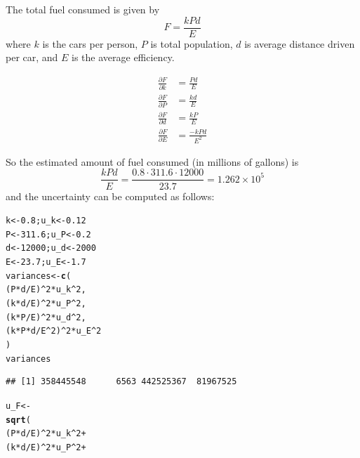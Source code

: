 \documentclass[twoside]{book}\usepackage[]{graphicx}\usepackage[]{xcolor}
\makeatletter
\newcommand{\hlnum}[1]{\textcolor[rgb]{0.686,0.059,0.569}{#1}}%
\newcommand{\hlopt}[1]{\textcolor[rgb]{0,0,0}{#1}}%
\newcommand{\hlstd}[1]{\textcolor[rgb]{0.345,0.345,0.345}{#1}}%
\newcommand{\hlkwb}[1]{\textcolor[rgb]{0.69,0.353,0.396}{#1}}%
\newcommand{\hlkwd}[1]{\textcolor[rgb]{0.737,0.353,0.396}{\textbf{#1}}}%
\newenvironment{kframe}{%
 \def\at@end@of@kframe{}%
 \ifinner\ifhmode%
  \def\at@end@of@kframe{\end{minipage}}%
  \begin{minipage}{\columnwidth}%
 \fi\fi%
 \def\FrameCommand##1{\hskip\@totalleftmargin \hskip-\fboxsep
 \colorbox{shadecolor}{##1}\hskip-\fboxsep
     \hskip-\linewidth \hskip-\@totalleftmargin \hskip\columnwidth}%
 \MakeFramed {\advance\hsize-\width
   \@totalleftmargin\z@ \linewidth\hsize
   \@setminipage}}%
 {\par\unskip\endMakeFramed%
 \at@end@of@kframe}
\newenvironment{knitrout}{}{} %
\newcommand{\Partial}[2]{\frac{\partial #1}{\partial #2}}
\makeatother
\begin{document}
\begin{solution}
The total fuel consumed is given by
\[
F = \frac{kPd}{E}
\]
where $k$ is the cars per person, $P$ is total population, $d$ is average distance 
driven per car, and $E$ is the average efficiency.

\begin{align*}
\Partial{F}{k} &= \frac{Pd}{E} 
\\
\Partial{F}{P} &= \frac{kd}{E}
\\
\Partial{F}{d} &= \frac{kP}{E}
\\
\Partial{F}{E} &= \frac{-kPd}{E^2}
\end{align*}

So the estimated amount of fuel consumed (in millions of gallons) is 
\[
\frac{kPd}{E} = \frac{0.8 \cdot 311.6 \cdot 12000 }{23.7}
= \ensuremath{1.262\times 10^{5}}
\]
and the uncertainty can be computed as follows:
\begin{knitrout}
\color{fgcolor}\begin{kframe}
\begin{alltt}
\hlstd{k} \hlkwb{<-} \hlnum{0.8}\hlstd{; u_k} \hlkwb{<-} \hlnum{0.12}
\hlstd{P} \hlkwb{<-} \hlnum{311.6}\hlstd{; u_P} \hlkwb{<-} \hlnum{0.2}
\hlstd{d} \hlkwb{<-} \hlnum{12000}\hlstd{; u_d} \hlkwb{<-} \hlnum{2000}
\hlstd{E} \hlkwb{<-} \hlnum{23.7}\hlstd{; u_E} \hlkwb{<-} \hlnum{1.7}
\hlstd{variances} \hlkwb{<-} \hlkwd{c}\hlstd{(}
            \hlstd{(P}\hlopt{*}\hlstd{d}\hlopt{/}\hlstd{E)}\hlopt{^}\hlnum{2} \hlopt{*} \hlstd{u_k}\hlopt{^}\hlnum{2} \hlstd{,}
            \hlstd{(k}\hlopt{*}\hlstd{d}\hlopt{/}\hlstd{E)}\hlopt{^}\hlnum{2} \hlopt{*} \hlstd{u_P}\hlopt{^}\hlnum{2} \hlstd{,}
            \hlstd{(k}\hlopt{*}\hlstd{P}\hlopt{/}\hlstd{E)}\hlopt{^}\hlnum{2} \hlopt{*} \hlstd{u_d}\hlopt{^}\hlnum{2} \hlstd{,}
            \hlstd{(k} \hlopt{*} \hlstd{P} \hlopt{*} \hlstd{d}\hlopt{/}\hlstd{E}\hlopt{^}\hlnum{2}\hlstd{)}\hlopt{^}\hlnum{2} \hlopt{*} \hlstd{u_E}\hlopt{^}\hlnum{2}
\hlstd{)}
\hlstd{variances}
\end{alltt}
\begin{verbatim}
## [1] 358445548      6563 442525367  81967525
\end{verbatim}
\begin{alltt}
\hlstd{u_F} \hlkwb{<-}
  \hlkwd{sqrt}\hlstd{(}
            \hlstd{(P}\hlopt{*}\hlstd{d}\hlopt{/}\hlstd{E)}\hlopt{^}\hlnum{2} \hlopt{*} \hlstd{u_k}\hlopt{^}\hlnum{2} \hlopt{+}
            \hlstd{(k}\hlopt{*}\hlstd{d}\hlopt{/}\hlstd{E)}\hlopt{^}\hlnum{2} \hlopt{*} \hlstd{u_P}\hlopt{^}\hlnum{2} \hlopt{+}

\end{alltt}
\end{kframe}
\end{knitrout}
\end{solution}
\end{document}
